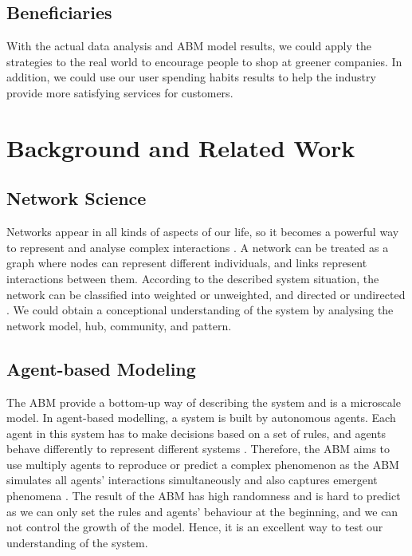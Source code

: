 \documentclass[a4paper,11pt]{article}
\begin{document}
\subsection{Beneficiaries}

With the actual data analysis and ABM model results, we could apply the strategies to the real world to encourage people to shop at greener companies. In addition, we could use our user spending habits results to help the industry provide more satisfying services for customers.

\section{Background and Related Work}
\subsection{Network Science}
Networks appear in all kinds of aspects of our life, so it becomes a powerful way to represent and analyse complex interactions \cite{6}. A network can be treated as a graph where nodes can represent different individuals, and links represent interactions between them. According to the described system situation, the network can be classified into weighted or unweighted, and directed or undirected \cite{7}. We could obtain a conceptional understanding of the system by analysing the network model, hub, community, and pattern.

\subsection{Agent-based Modeling}
The ABM provide a bottom-up way of describing the system and is a microscale model. In agent-based modelling, a system is built by autonomous agents. Each agent in this system has to make decisions based on a set of rules, and agents behave differently to represent different systems \cite{3}.
Therefore, the ABM aims to use multiply agents to reproduce or predict a complex phenomenon as the ABM simulates all agents' interactions simultaneously and also captures emergent phenomena \cite{2}. 
The result of the ABM has high randomness and is hard to predict as we can only set the rules and agents' behaviour at the beginning, and we can not control the growth of the model.
Hence, it is an excellent way to test our understanding of the system.
\end{document}
